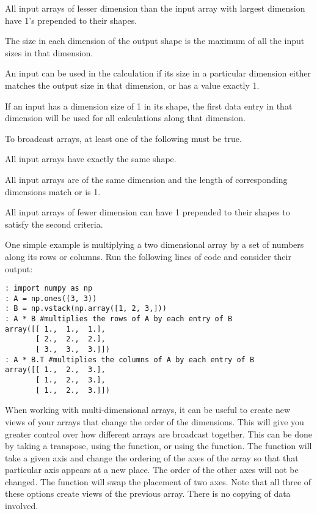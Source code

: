 \begin{remunerate}
\item All input arrays of lesser dimension than the input array with largest dimension have 1's prepended to their shapes.
\item The size in each dimension of the output shape is the maximum of all the input sizes in that dimension.
\item An input can be used in the calculation if its size in a particular dimension either matches the output size in that dimension, or has a value exactly 1.
\item If an input has a dimension size of 1 in its shape, the first data entry in that dimension will be used for all calculations along that dimension.
\end{remunerate}
To broadcast arrays, at least one of the following must be true.
\begin{remunerate}
\item All input arrays have exactly the same shape.
\item All input arrays are of the same dimension and the length of corresponding dimensions match or is 1.
\item All input arrays of fewer dimension can have 1 prepended to their shapes to satisfy the second criteria.
\end{remunerate}

One simple example is multiplying a two dimensional array by a set of numbers along its rows or columns.
Run the following lines of code and consider their output:
\begin{lstlisting}
: import numpy as np
: A = np.ones((3, 3))
: B = np.vstack(np.array([1, 2, 3,]))
: A * B #multiplies the rows of A by each entry of B
array([[ 1.,  1.,  1.],
       [ 2.,  2.,  2.],
       [ 3.,  3.,  3.]])
: A * B.T #multiplies the columns of A by each entry of B
array([[ 1.,  2.,  3.],
       [ 1.,  2.,  3.],
       [ 1.,  2.,  3.]])
\end{lstlisting}

When working with multi-dimensional arrays, it can be useful to create new views of your arrays that change the order of the dimensions.
This will give you greater control over how different arrays are broadcast together.
This can be done by taking a transpose, using the  function, or using the  function.
The  function will take a given axis and change the ordering of the axes of the array so that that particular axis appears at a new place.
The order of the other axes will not be changed.
The  function will swap the placement of two axes.
Note that all three of these options create views of the previous array.
There is no copying of data involved.

